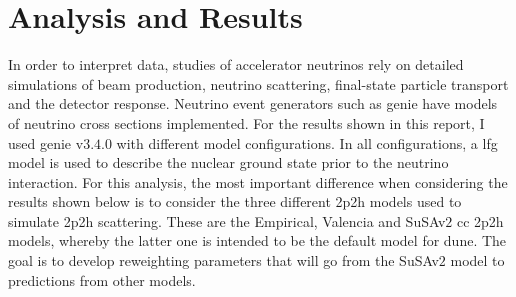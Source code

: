 
\vspace{-9mm}
\section{Analysis and Results} \vspace{-3mm}
In order to interpret data, studies of accelerator neutrinos rely on detailed simulations of beam production, neutrino scattering, final-state particle transport and the detector response. Neutrino event generators such as \acrshort{genie} have models of neutrino cross sections implemented. %
For the results shown in this report, I used \acrshort{genie} v$3.4.0$ with different model configurations. In all configurations, a \acrfull{lfg} model is used to describe the nuclear ground state prior to the neutrino interaction. %
For this analysis, the most important difference when considering the results shown below is to consider the three different \acrshort{2p2h} models used to simulate \acrshort{2p2h} scattering. These are the Empirical, Valencia and SuSAv$2$ \acrshort{cc} \acrshort{2p2h} models, whereby the latter one is intended to be the default model for \acrshort{dune}. The goal is to develop reweighting parameters that will go from the SuSAv$2$ model to predictions from other models.

